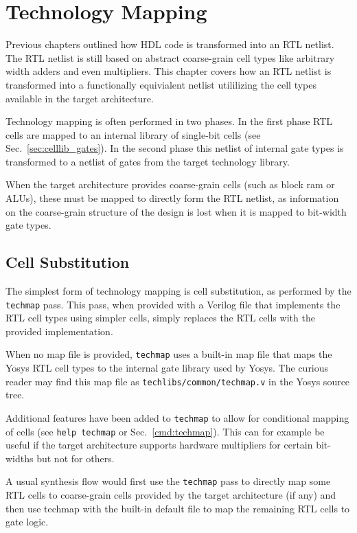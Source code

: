 
\chapter{Technology Mapping}
\label{chapter:techmap}

Previous chapters outlined how HDL code is transformed into an RTL netlist. The
RTL netlist is still based on abstract coarse-grain cell types like arbitrary
width adders and even multipliers. This chapter covers how an RTL netlist is
transformed into a functionally equivialent netlist utililizing the cell types
available in the target architecture.

Technology mapping is often performed in two phases. In the first phase RTL cells
are mapped to an internal library of single-bit cells (see Sec.~\ref{sec:celllib_gates}).
In the second phase this netlist of internal gate types is transformed to a netlist
of gates from the target technology library.

When the target architecture provides coarse-grain cells (such as block ram
or ALUs), these must be mapped to directly form the RTL netlist, as information
on the coarse-grain structure of the design is lost when it is mapped to
bit-width gate types.

\section{Cell Substitution}

The simplest form of technology mapping is cell substitution, as performed by
the {\tt techmap} pass. This pass, when provided with a Verilog file that
implements the RTL cell types using simpler cells, simply replaces the RTL
cells with the provided implementation.

When no map file is provided, {\tt techmap} uses a built-in map file that
maps the Yosys RTL cell types to the internal gate library used by Yosys.
The curious reader may find this map file as {\tt techlibs/common/techmap.v} in
the Yosys source tree.

Additional features have been added to {\tt techmap} to allow for conditional
mapping of cells (see {\tt help techmap} or Sec.~\ref{cmd:techmap}). This can
for example be useful if the target architecture supports hardware multipliers for
certain bit-widths but not for others.

A usual synthesis flow would first use the {\tt techmap} pass to directly map
some RTL cells to coarse-grain cells provided by the target architecture (if
any) and then use techmap with the built-in default file to map the remaining
RTL cells to gate logic.

